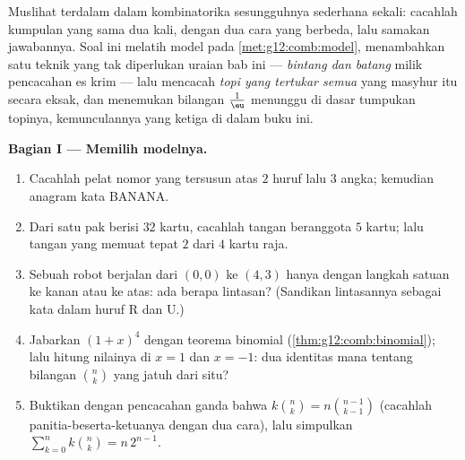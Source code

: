 \begin{problem}
\label{pb:g12:comb:1}
Muslihat terdalam dalam kombinatorika sesungguhnya sederhana sekali: cacahlah
kumpulan yang sama dua kali, dengan dua cara yang berbeda, lalu samakan
jawabannya. Soal ini melatih model pada
\cref{met:g12:comb:model}, menambahkan satu teknik yang tak diperlukan
uraian bab ini --- \emph{bintang dan batang} milik pencacahan es krim
--- lalu mencacah \emph{topi yang tertukar semua} yang masyhur itu secara eksak, dan
menemukan bilangan $\frac1\eu$ menunggu di dasar tumpukan
topinya, kemunculannya yang ketiga di dalam buku ini.

\medskip
\noindent\textbf{Bagian I --- Memilih modelnya.}
\begin{enumerate}
  \item Cacahlah pelat nomor yang tersusun atas $2$ huruf lalu
        $3$ angka; kemudian anagram kata BANANA.
  \item Dari satu pak berisi $32$ kartu, cacahlah tangan beranggota $5$ kartu;
        lalu tangan yang memuat tepat $2$ dari $4$ kartu raja.
  \item Sebuah robot berjalan dari $(0,0)$ ke $(4,3)$ hanya dengan langkah
        satuan ke kanan atau ke atas: ada berapa lintasan? (Sandikan lintasannya
        sebagai kata dalam huruf R dan U.)
  \item Jabarkan $(1 + x)^4$ dengan teorema binomial
        (\cref{thm:g12:comb:binomial}); lalu hitung nilainya di
        $x = 1$ dan $x = -1$: dua identitas mana tentang
        bilangan $\binom nk$ yang jatuh dari situ?
  \item Buktikan dengan pencacahan ganda bahwa
        $k\binom nk = n\binom{n-1}{k-1}$ (cacahlah
        panitia-beserta-ketuanya dengan dua cara), lalu simpulkan
        $\sum_{k=0}^{n} k\binom nk = n\,2^{n-1}$.
\end{enumerate}


\end{problem}
